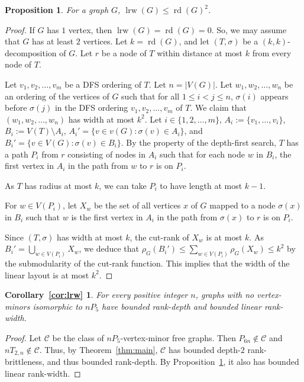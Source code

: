 \documentclass[11pt]{article}
\newtheorem{proposition}[theorem]{Proposition}
\newtheorem*{corollarylrw}{Corollary~\ref{cor:lrw}}
\newcommand\abs[1]{\lvert #1\rvert}
\newcommand\lrw{\operatorname{lrw}}
\newcommand\rd{\operatorname{rd}}
\begin{document}
	\begin{proposition}\label{prop:inequality}
          For a graph $G$, $\lrw(G)\le \rd (G)^2$.
	\end{proposition}
	\begin{proof}
	If $G$ has $1$ vertex, then $\lrw(G)=\rd(G)=0$. So, we may assume that $G$ has at least $2$ vertices.
	Let $k=\rd(G)$, and let $(T, \sigma)$ be a $(k,k)$-decomposition of $G$.
	Let $r$ be a node of $T$ within distance at most $k$ from every node of $T$.
	
	Let $v_1, v_2, \ldots, v_m$ be a DFS ordering of $T$.
        Let $n=\abs{V(G)}$.
        Let $w_1,w_2,\ldots,w_n$ be an ordering of the vertices of $G$
        such that for all $1\le i<j\le n$, $\sigma(i)$ appears before $\sigma(j)$
        in the DFS ordering $v_1,v_2,\ldots,v_m$ of $T$.
	We claim that $(w_1, w_2, \ldots, w_n)$ has width at most $k^2$.
	Let $i\in \{1, 2, \ldots, m\}$, $A_i:=\{v_1, \ldots, v_i\}$,  $B_i:=V(T)\setminus A_i$,
        $A_i'=\{v\in v(G): \sigma(v)\in A_i\}$,
        and $B_i'=\{v\in V(G):\sigma(v)\in B_i\}$.
	By the property of the depth-first search,
        $T$ has a path $P_i$ from $r$ consisting of nodes in $A_i$
        such that
        for each node $w$ in $B_i$,
        the first vertex in $A_i$ 
        in the path from $w$ to $r$ is on $P_i$. 

        As $T$ has radius at most $k$,
        we can take $P_i$ to have length at most $k-1$.

        For $w\in V(P_i)$, let $X_w$ be the set of all vertices $x$ of $G$
        mapped to a node $\sigma(x)$ in $B_i$
        such that $w$ is  the first vertex in $A_i$ 
        in the path from $\sigma(x)$ to $r$ is on $P_i$.

        Since $(T,\sigma)$ has width at most $k$,
        the cut-rank of $X_w$ is at most $k$.
        As $B_i'=\bigcup_{w\in V(P_i)} X_w$,
        we deduce that
        $\rho_G(B_i')\le \sum_{w\in V(P_i)} \rho_G(X_w)\le k^2$
        by the submodularity of the cut-rank function.
        This implies that the width of the linear layout is at most $k^2$.
	\end{proof}
	
	\begin{corollarylrw}
          For every positive integer $n$,
          graphs with no vertex-minors isomorphic to $nP_5$
          have bounded rank-depth and bounded linear rank-width.
	\end{corollarylrw}
	\begin{proof}
	Let $\mathcal{C}$ be the class of $nP_5$-vertex-minor free graphs. Then $P_{6n}\notin \mathcal{C}$ and $nT_{2,n}\notin \mathcal{C}$.
	Thus, by Theorem~\ref{thm:main}, $\mathcal{C}$ has bounded depth-$2$ rank-brittleness, and thus bounded rank-depth.
	By Proposition~\ref{prop:inequality}, it also has bounded linear rank-width.
	\end{proof}
	
\end{document}
